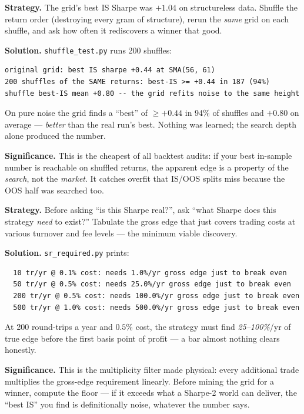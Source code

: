 \begin{example}\label{ex:shuffle}
\textbf{Strategy.} The grid's best IS Sharpe was $+1.04$ on
structureless data. Shuffle the return order (destroying every
gram of structure), rerun the \emph{same} grid on each shuffle,
and ask how often it rediscovers a winner that good.

\textbf{Solution.} \texttt{shuffle\_test.py} runs 200 shuffles:
\begin{verbatim}
original grid: best IS sharpe +0.44 at SMA(56, 61)
200 shuffles of the SAME returns: best-IS >= +0.44 in 187 (94%)
shuffle best-IS mean +0.80 -- the grid refits noise to the same height
\end{verbatim}
On pure noise the grid finds a ``best'' of $\ge+0.44$ in 94\% of
shuffles and $+0.80$ on average --- \emph{better} than the real
run's best. Nothing was learned; the search depth alone produced
the number.

\textbf{Significance.} This is the cheapest of all backtest
audits: if your best in-sample number is reachable on shuffled
returns, the apparent edge is a property of the \emph{search}, not
the \emph{market}. It catches overfit that IS/OOS splits miss
because the OOS half was searched too.
\end{example}

\begin{example}\label{ex:costfloor}
\textbf{Strategy.} Before asking ``is this Sharpe real?'', ask
``what Sharpe does this strategy \emph{need} to exist?'' Tabulate
the gross edge that just covers trading costs at various turnover
and fee levels --- the minimum viable discovery.

\textbf{Solution.} \texttt{sr\_required.py} prints:
\begin{verbatim}
  10 tr/yr @ 0.1% cost: needs 1.0%/yr gross edge just to break even
  50 tr/yr @ 0.5% cost: needs 25.0%/yr gross edge just to break even
  200 tr/yr @ 0.5% cost: needs 100.0%/yr gross edge just to break even
  500 tr/yr @ 1.0% cost: needs 500.0%/yr gross edge just to break even
\end{verbatim}
At 200 round-trips a year and $0.5\%$ cost, the strategy must find
\emph{25--100\%}/yr of true edge before the first basis point of
profit --- a bar almost nothing clears honestly.

\textbf{Significance.} This is the multiplicity filter made
physical: every additional trade multiplies the gross-edge
requirement linearly. Before mining the grid for a winner, compute
the floor --- if it exceeds what a Sharpe-2 world can deliver, the
``best IS'' you find is definitionally noise, whatever the number
says.
\end{example}

